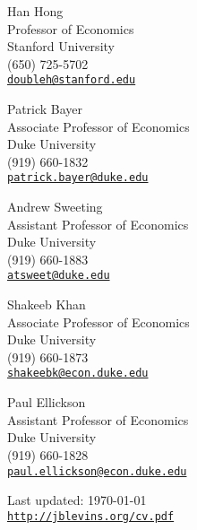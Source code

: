 \documentclass[letterpaper]{article}
\renewenvironment{itemize}{
  \begin{list}{}{
    \setlength{\leftmargin}{1em}
  }
}{
  \end{list}
}
\begin{document}
\begin{minipage}[t]{0.5\textwidth}
\begin{itemize}
\item Han Hong \\ Professor of Economics \\ Stanford University \\
  (650) 725-5702 \\
  \href{mailto:doubleh@stanford.edu}{\tt doubleh@stanford.edu}
\item Patrick Bayer \\ Associate Professor of Economics \\ Duke University \\
  (919) 660-1832 \\
  \href{mailto:patrick.bayer@duke.edu}{\tt patrick.bayer@duke.edu}
\item Andrew Sweeting \\ Assistant Professor of Economics \\ Duke University \\
  (919) 660-1883 \\
  \href{mailto:atsweet@duke.edu}{\tt atsweet@duke.edu}
\end{itemize}
\end{minipage}
\begin{minipage}[t]{0.5\textwidth}
\begin{itemize}
\item Shakeeb Khan \\ Associate Professor of Economics \\ Duke University \\
  (919) 660-1873 \\
  \href{mailto:shakeebk@econ.duke.edu}{\tt shakeebk@econ.duke.edu}
\item Paul Ellickson \\ Assistant Professor of Economics \\ Duke University \\
  (919) 660-1828 \\
  \href{paul.ellickson@econ.duke.edu}{\tt paul.ellickson@econ.duke.edu}
\end{itemize}
\end{minipage}


\bigskip

\begin{center}
\begin{footnotesize}
Last updated: \today \\
\href{http://jblevins.org/cv}{\tt http://jblevins.org/cv.pdf}
\end{footnotesize}
\end{center}
\end{document}
